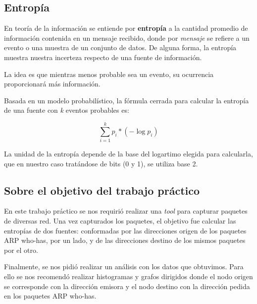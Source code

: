\subsection{Entropía}

En teoría de la información se entiende por \textbf{entropía} a la cantidad promedio de información contenida en un mensaje recibido, donde por \textit{mensaje} se refiere a un evento o una muestra de un conjunto de datos. De alguna forma, la entropía muestra nuestra incerteza respecto de una fuente de información.\newline

La idea es que mientras menos probable sea un evento, su ocurrencia proporcionará más información.\newline

Basada en un modelo probabilístico, la fórmula cerrada para calcular la entropía de una fuente con \textit{k} eventos probables es:

$$\sum \limits_{i=1}^k p_i * (- \log{p_i})$$\newline

La unidad de la entropía depende de la base del logartimo elegida para calcularla, que en nuestro caso tratándose de bits (0 y 1), se utiliza base 2.\newline

\subsection{Sobre el objetivo del trabajo práctico}

En este trabajo práctico se nos requirió realizar una \textit{tool} para capturar paquetes de diversas red. Una vez capturados los paquetes, el objetivo fue calcular las entropías de dos fuentes: conformadas por las direcciones origen de los paquetes ARP who-has, por un lado, y de las direcciones destino de los mismos paquetes por el otro.\newline

Finalmente, se nos pidió realizar un análisis con los datos que obtuvimos. Para ello se nos recomendó realizar histogramas y grafos dirigidos donde el nodo origen se corresponde con la dirección emisora y el nodo destino con la dirección pedida en los paquetes ARP who-has.